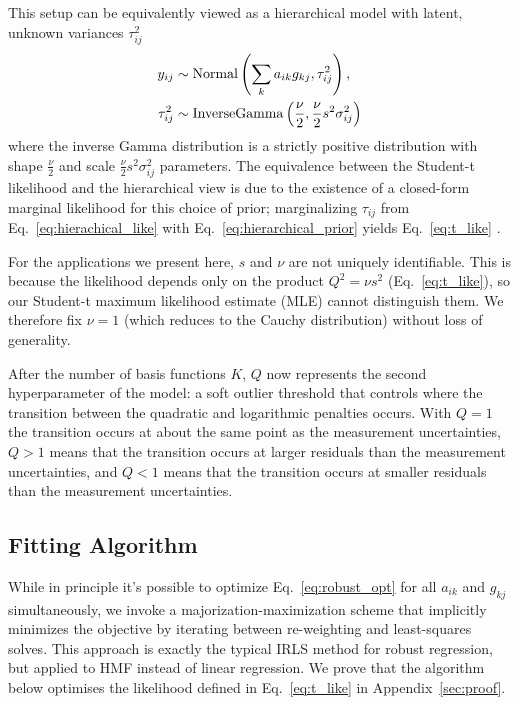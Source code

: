 \documentclass[onecolumn,floatfix,linenumbers,trackchanges]{aastex631}
\begin{document}
This setup can be equivalently viewed as a hierarchical model with latent, unknown variances $\tau_{ij}^2$
\begin{align}
    y_{ij} &\sim {\rm Normal} \left( \sum_k a_{ik} g_{kj}, \tau_{ij}^2 \right), \label{eq:hierachical_like} \\
    \tau_{ij}^2 &\sim {\rm InverseGamma} \left( \frac{\nu}{2}, \frac{\nu}{2} s^2 \sigma_{ij}^2 \right) \label{eq:hierarchical_prior}
\end{align}
where the inverse Gamma distribution is a strictly positive distribution with shape $\frac{\nu}{2}$ and scale $\frac{\nu}{2} s^2 \sigma_{ij}^2$ parameters.
The equivalence between the Student-t likelihood and the hierarchical view is due to the existence of a closed-form marginal likelihood for this choice of prior; marginalizing $\tau_{ij}$ from Eq.~\eqref{eq:hierachical_like} with Eq.~\eqref{eq:hierarchical_prior} yields Eq.~\eqref{eq:t_like} \citep[e.g.][]{lange1989}.

For the applications we present here, $s$ and $\nu$ are not uniquely identifiable.
This is because the likelihood depends only on the product $Q^2=\nu s^2$ (Eq.~\ref{eq:t_like}), so our Student-t maximum likelihood estimate (MLE) cannot distinguish them. 
We therefore fix $\nu=1$ (which reduces to the Cauchy distribution) without loss of generality.

After the number of basis functions $K$, $Q$ now represents  the second hyperparameter of the model: a soft outlier threshold that controls where the transition between the quadratic and logarithmic penalties occurs.
With $Q=1$ the transition occurs at about the same point as the measurement uncertainties, ${Q}>1$ means that the transition occurs at larger residuals than the measurement uncertainties, and ${Q}<1$ means that the transition occurs at smaller residuals than the measurement uncertainties. 

\subsection{Fitting Algorithm} \label{sec:fitting}

While in principle it's possible to optimize Eq.~\eqref{eq:robust_opt} for all $a_{ik}$ and $g_{kj}$ simultaneously, we invoke a majorization-maximization scheme that implicitly minimizes the objective by iterating between re-weighting and least-squares solves.
This approach is exactly the typical IRLS method for robust regression, but applied to HMF instead of linear regression.
We prove that the algorithm below optimises the likelihood defined in Eq.~\eqref{eq:t_like} in Appendix~\ref{sec:proof}.
\end{document}
